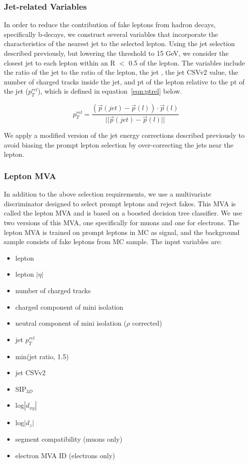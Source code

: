 \subsubsection{Jet-related Variables}
In order to reduce the contribution of fake leptons from hadron decays, specifically b-decays, we construct several variables that incorporate
the characteristics of the nearest jet to the selected lepton. Using the jet selection described previously, but lowering the \pt threshold to
15 GeV, we consider the closest jet to each lepton within an R $<$ 0.5 of the lepton. The variables include the ratio of the jet to the ratio
of the lepton, the jet \pt, the jet CSVv2 value, the number of charged tracks inside the jet, and pt of the lepton relative to the pt of the jet
($p_{T}^{rel}$), which is defined in equation~\ref{eqn:ptrel} below. 

\begin{equation}
\label{eqn:ptrel}
 p_{T}^{rel} = \frac{(\vec{p}(jet)-\vec{p}(l))\cdot\vec{p}(l)}{||\vec{p}(jet)-\vec{p}(l)||}
\end{equation}

We apply a modified version of the jet energy corrections described previously to avoid biasing the 
prompt lepton selection by over-correcting the jets near the lepton.

\subsubsection{Lepton MVA}
In addition to the above selection requirements, we use a multivariate discriminator designed to select prompt leptons and reject fakes.
This MVA is called the lepton MVA and is based on a boosted decision tree classifier. We use two versions of this MVA, one specifically for
muons and one for electrons. The lepton MVA is trained on prompt leptons in \tth
MC as signal, and the background sample consists of fake leptons from \ttbar MC sample. The input variables are: 

\begin{itemize}
  \item lepton \pt
  \item lepton $|\eta|$
  \item number of charged tracks
  \item charged component of mini isolation
  \item neutral component of mini isolation ($\rho$ corrected)
  \item jet $p_{T}^{rel}$
  \item min(jet \pt ratio, 1.5)
  \item jet CSVv2
  \item SIP$_{3D}$
  \item log$|d_{xy}|$
  \item log$|d_{z}|$
  \item segment compatibility (muons only)
  \item electron MVA ID (electrons only)
\end{itemize}

